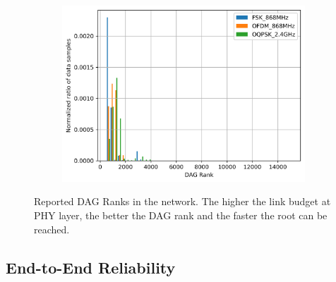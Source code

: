 \documentclass[journal]{IEEEtran}
\begin{document}
\begin{figure}[ht!]
\begin{subfigure}{0.6\columnwidth}
        \label{fig:dagrank_cdf}
	\end{subfigure}%
    ~ 
	\begin{subfigure}{0.6\columnwidth}
		\centering
	\includegraphics[width=1\columnwidth]{dagRank_pdf_plot_full_steady_normalized}
	\label{fig:dagrank_pdf}
	\end{subfigure}%

	\caption{Reported DAG Ranks in the network. The higher the link budget at PHY layer, the better the DAG rank and the faster the root can be reached. } 
	\label{fig:dagrank_all}
\end{figure}
\subsection{End-to-End Reliability}
\label{sec:reliability}


\end{document}
